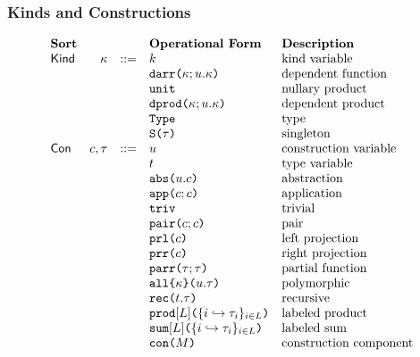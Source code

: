 \subsubsection{Kinds and Constructions}
\[\begin{array}{lrlllll}
\textbf{Sort} & & & \textbf{Operational Form} 
& \textbf{Description}\\
\mathsf{Kind} & \kappa & ::= & k & \text{kind variable}\\
&&& \texttt{darr}\texttt{(}\kappa; u.\kappa\texttt{)} 
& \text{dependent function}\\
&&& \texttt{unit} 
& \text{nullary product}\\
&&& \texttt{dprod}\texttt{(}\kappa; u.\kappa\texttt{)} 
& \text{dependent product}\\
&&& \texttt{Type} 
& \text{type}\\
&&& \texttt{S}\texttt{(}\tau\texttt{)} 
& \text{singleton}\\
\mathsf{Con} & c, \tau & ::= & u 
& \text{construction variable}\\
&&& t 
& \text{type variable}
\\
&&& \texttt{abs}\texttt{(}u.c\texttt{)} 
& \text{abstraction}\\
&&& \texttt{app}\texttt{(}c; c\texttt{)} 
& \text{application}\\
&&& \texttt{triv} 
& \text{trivial}\\
&&& \texttt{pair}\texttt{(}c; c\texttt{)}
& \text{pair}\\
&&& \texttt{prl}\texttt{(}c\texttt{)} 
& \text{left projection}\\
&&& \texttt{prr}\texttt{(}c\texttt{)} 
& \text{right projection}\\
&&& \texttt{parr}\texttt{(}\tau; \tau\texttt{)} 
& \text{partial function}\\
&&& \texttt{all}\texttt{\{}\kappa\texttt{\}(}u.\tau\texttt{)} 
& \text{polymorphic}\\
&&& \texttt{rec}\texttt{(}t.\tau\texttt{)} 
& \text{recursive}\\
&&& \texttt{prod}[L]\texttt{(}\{i \hookrightarrow \tau_{i}\}_{i \in L}\texttt{)} 
& \text{labeled product}\\
&&& \texttt{sum}[L]\texttt{(}\{i \hookrightarrow \tau_{i}\}_{i \in L}\texttt{)} 
& \text{labeled sum}\\
&&& \texttt{con}\texttt{(}M\texttt{)} 
& \text{construction component}
\end{array}\]
\clearpage

